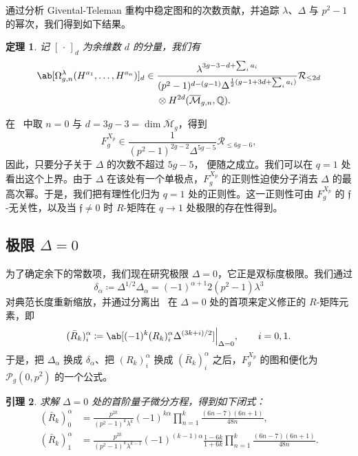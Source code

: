 \documentclass{amsart}
\newtheorem{thm}{定理}[section]
\newtheorem{lem}[thm]{引理}
\theoremstyle{definition}
\theoremstyle{remark}
\theoremstyle{plain}
\theoremstyle{definition}
\theoremstyle{remark}
\newcommand{\Q}{\mathbb{Q}}
\newcommand{\Mbar}{\overline{\mathcal{M}}}
\newcommand{\mc}[1]{\mathcal{#1}}
\newcommand{\mf}[1]{\mathfrak{#1}}
\newcommand{\1}{\mathbf{1}}
\newcommand{\2}{\mathbf{2}}
\newcommand{\3}{\mathbf{3}}
\begin{document}
通过分析 Givental-Teleman 重构中稳定图和的次数贡献，并追踪 \(\lambda\)、\(\Delta\) 与 \(p^2-1\) 的幂次，我们得到如下结果。

\begin{thm}%
\label{thm:local P1 reconstruction}
    记 \([\,\cdot\,]_d\) 为余维数 \(d\) 的分量，我们有
    \begin{align*}
        \ab[\Omega^{\lambda}_{g,n}(H^{a_1},\ldots,H^{a_n})]_d \in{}& \frac{\lambda^{3g-3-d+\sum_i a_i}}{(p^2-1)^{d-(g-1)}\Delta^{\frac{1}{2}(g-1+3d+\sum_i a_i)}}\mc{R}_{\leq 2d} \\
        &\otimes H^{2d}(\Mbar_{g,n},\Q).
    \end{align*}
\end{thm}

在~ 中取 \(n=0\) 与 \(d = 3g-3 = \dim \Mbar_g\)，得到
\[ F_g^{X_p} \in \frac{1}{(p^2-1)^{2g-2}\Delta^{5g-5}}\mc{R}_{\leq 6g-6}, \]
因此，只要分子关于 \(\Delta\) 的次数不超过 \(5g-5\)， 便随之成立。我们可以在 \(q=1\) 处看出这个上界。由于 \(\Delta\) 在该处有一个单极点，\(F_g^{X_p}\) 的正则性迫使分子消去 \(\Delta\) 的最高次幂。于是，我们把有理性化归为 \(q=1\) 处的正则性。这一正则性可由 \(F_g^{X_p}\) 的 \(\mf{f}\)-无关性，以及当 \(\mf{f} \neq 0\) 时 \(R\)-矩阵在 \(q \to 1\) 处极限的存在性得到。

\subsection{极限 \(\Delta = 0\)}%
\label{sub:The limit Delta = 0}

为了确定余下的常数项，我们现在研究极限 \(\Delta = 0\)，它正是双标度极限。我们通过
\[ \delta_{\alpha} \coloneqq \Delta^{1/2}\Delta_{\alpha} = (-1)^{\alpha+1}2(p^2-1)\lambda^3 \]
对典范长度重新缩放，并通过分离出~ 在 \(\Delta = 0\) 处的首项来定义修正的 \(R\)-矩阵元素，即
\[ (\bar{R}_k)_i^{\alpha} \coloneqq \ab[(-1)^k (R_k)_i^{\alpha}\Delta^{(3k+i)/2}]\Big|_{\Delta=0}, \qquad i = 0,1. \]
于是，把 \(\Delta_{\alpha}\) 换成 \(\delta_{\alpha}\)、把 \((R_k)_i^{\alpha}\) 换成 \((\bar{R}_k)_i^{\alpha}\) 之后，\(F_g^{X_p}\) 的图和便化为 \(\mc{P}_g(0,p^2)\) 的一个公式。

\begin{lem}%
\label{lem:R matrix at Delta zero}
    求解 \(\Delta = 0\) 处的首阶量子微分方程，得到如下闭式：
    \begin{align*}
        (\bar{R}_k)_0^{\alpha} &= \frac{p^{2k}}{(p^2-1)^k\lambda^k}(-1)^{k\alpha}\prod_{n=1}^k \frac{(6n-7)(6n+1)}{48n}, \\
        (\bar{R}_k)_1^{\alpha} &= \frac{p^{2k}}{(p^2-1)^k \lambda^{k-1}}(-1)^{(k-1)\alpha}\frac{1-6k}{1+6k}\prod_{n=1}^k \frac{(6n-7)(6n+1)}{48n}.
    \end{align*}
\end{lem}
\end{document}
